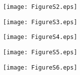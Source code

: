 \documentclass[amsmath,amssymb]{nature}
\begin{document}
\begin{figure}
	\begin{center}
		\hspace{-1cm}
		\texttt{[image: FigureS2.eps]}
	\end{center}
\end{figure}



\begin{figure}
	\begin{center}
		\hspace{-1cm}
		\texttt{[image: FigureS3.eps]}
	\end{center}
\end{figure}



\begin{figure}
	\begin{center}
		\hspace{-1cm}
		\texttt{[image: FigureS4.eps]}
	\end{center}
\end{figure}
	

\begin{figure}
	\begin{center}
		\hspace{-1cm}
		\texttt{[image: FigureS5.eps]}
	\end{center}
\end{figure}


\begin{figure}
	\begin{center}
		\hspace{-1cm}
		\texttt{[image: FigureS6.eps]}
	\end{center}
\end{figure}
\newpage	
	
\end{document}
